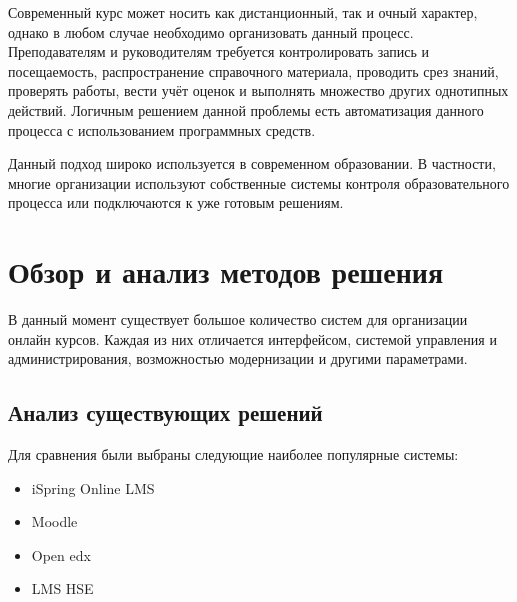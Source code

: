 \documentclass[a4paper,14pt]{article}
\begin{document}
Современный курс может носить как дистанционный, так и очный характер, однако в любом случае необходимо организовать данный процесс.
Преподавателям и руководителям требуется контролировать запись и посещаемость, распространение справочного материала, проводить срез знаний, проверять работы, вести учёт оценок и выполнять множество других однотипных действий.
Логичным решением данной проблемы есть автоматизация данного процесса с использованием программных средств.

Данный подход широко используется в современном образовании. В частности, многие организации используют собственные системы контроля образовательного процесса или подключаются к уже готовым решениям.








\section{Обзор и анализ методов решения}

В данный момент существует большое количество систем для организации онлайн курсов.
Каждая из них отличается интерфейсом, системой управления и администрирования, возможностью модернизации и другими параметрами.

\subsection{Анализ существующих решений}

Для сравнения были выбраны следующие наиболее популярные системы:

\begin{itemize}
	\item iSpring Online LMS
	\item Moodle	
	\item Open edx
	\item LMS HSE
\end{itemize}
\end{document}
